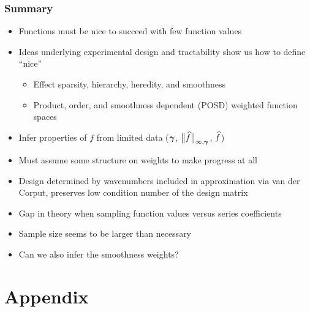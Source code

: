 \documentclass[11pt,compress,xcolor={usenames,dvipsnames},aspectratio=169]{beamer}
\begin{document}
\begin{frame}
\frametitle{Summary}
\vspace{-3ex}
\begin{itemize}
	\item Functions must be \alert{nice} to succeed with few function values
	
	\item Ideas underlying \alert{experimental design} and \alert{tractability} show us how to define \alert{``nice''}
	
	\begin{itemize}
		\item Effect sparsity, hierarchy, heredity, and smoothness
		
		\item Product, order, and smoothness dependent (POSD) weighted function spaces
	\end{itemize}
	
	\item \alert{Infer} properties of $f$ from limited data ($\vgamma$, $\bignorm[\infty, \vgamma]{\hf}$, $\hf$)
	
	\item Must assume some structure on weights to make  progress at all
	
	\item \alert{Design} determined by wavenumbers included in approximation via van der Corput, preserves low condition number of the design matrix
	
	\item \alert{Gap} in theory when sampling function values versus series coefficients
	
	\item Sample size seems to be larger than necessary
	
	\item Can we also infer the smoothness weights?
	
\end{itemize}


\end{frame}



\thankyouframe

\printbibliography

\section{Appendix}
\end{document}
